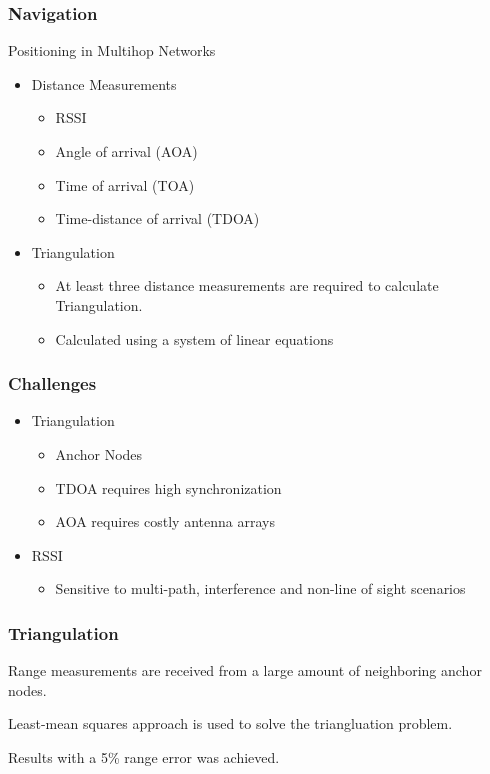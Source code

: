    

\begin{frame}[t]
  \frametitle{Navigation}
  
  Positioning in Multihop Networks
  \begin{itemize}
  \item Distance Measurements
    \begin{itemize}
    \item RSSI
    \item Angle of arrival (AOA)
    \item Time of arrival (TOA)
    \item Time-distance of arrival (TDOA)
    \end{itemize}
  \item Triangulation
    \begin{itemize}
      \item At least three distance measurements are required to calculate
        Triangulation.
      \item Calculated using a system of linear equations
    \end{itemize}
  \end{itemize}

  \vfill

\end{frame}

\begin{frame}[t]
  \frametitle{Challenges}

  \begin{itemize}
  \item Triangulation
    \begin{itemize}
    \item Anchor Nodes
    \item TDOA requires high synchronization
    \item AOA requires costly antenna arrays
    \end{itemize}
  \item RSSI
    \begin{itemize}
      \item Sensitive to multi-path, interference and non-line of sight
        scenarios
    \end{itemize}
  \end{itemize}

  \vfill

\end{frame}

\begin{frame}[t]
  \frametitle{Triangulation}

  Range measurements are received from a large amount of neighboring anchor
  nodes.

  Least-mean squares approach is used to solve the triangluation problem.

  Results with a 5\% range error was achieved.

  \vfill

\end{frame}

